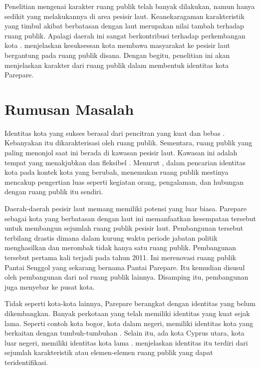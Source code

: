 \documentclass[12pt]{simart} %
\begin{document}
Penelitian mengenai karakter ruang publik telah banyak dilakukan, namun hanya sedikit yang melakukannya di area pesisir laut. Keanekaragaman karakteristik yang timbul akibat berbatasan dengan laut merupakan nilai tambah terhadap ruang publik. Apalagi daerah ini sangat berkontribusi terhadap perkembangan kota \citep{hussein2014}. \cite{hussein2014} menjelaskan kesuksessan kota membawa masyarakat ke pesisir laut bergantung pada ruang publik disana. Dengan begitu, penelitian ini akan menjelaskan karakter dari ruang publik dalam membentuk identitas kota Parepare.

\section{Rumusan Masalah}

Identitas kota yang sukses berasal dari pencitran yang kuat dan bebas \citep{oktay2002}. Kebanyakan itu dikarakterisasi oleh ruang publik. Sementara, ruang publik yang paling menonjol saat ini berada di kawasan pesisir laut. Kawasan ini adalah tempat yang menakjubkan dan fleksibel \citep{hussein2014}. Menurut \cite{oktay2002}, dalam pencarian identitas kota pada kontek kota yang berubah, menemukan ruang publik mestinya mencakup pengertian luas seperti kegiatan orang, pengalaman, dan hubungan dengan ruang publik itu sendiri.

Daerah-daerah pesisir laut memang memiliki potensi yang luar biasa. Parepare sebagai kota yang berbatasan dengan laut ini memanfaatkan kesempatan tersebut untuk membangun sejumlah ruang publik pesisir laut. Pembangunan tersebut terbilang drastis dimana dalam kurung waktu periode jabatan politik menghasilkan dan merombak tidak hanya satu ruang publik. Pembangunan tersebut pertama kali terjadi pada tahun 2011. Ini merenovasi ruang publik Pantai Senggol yang sekarang bernama Pantai Parepare. Itu kemudian disusul oleh pembangunan dari nol ruang publik lainnya. Disamping itu, pembangunan juga menyebar ke pusat kota.

Tidak seperti kota-kota lainnya, Parepare berangkat dengan identitas yang belum dikembangkan. Banyak perkotaan yang telah memiliki identitas yang kuat sejak lama. Seperti contoh kota bogor, kota dalam negeri, memiliki identitas kota yang berkaitan dengan tumbuh-tumbuhan \citep{hartanti2014}. Selain itu, ada kota Cyprus utara, kota luar negeri, memiliki identitas kota lama \citep{oktay2002}. \cite{oktay2002} menjelaskan identitas itu terdiri dari sejumlah karakteristik atau elemen-elemen ruang publik yang dapat teridentifikasi.
\end{document}
